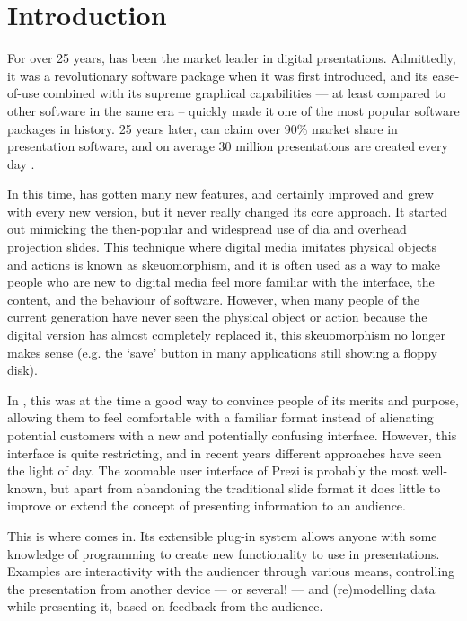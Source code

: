 
 \chapter{Introduction}

  For over 25 years, \ppt* has been the market leader in digital prsentations.
  Admittedly, it was a revolutionary software package when it was first
  introduced, and its ease-of-use combined with its supreme graphical
  capabilities --- at least compared to other software in the same era --
  quickly made it one of the most popular software packages in history. 25
  years later, \ppt* can claim over 90\% market share in presentation software,
  and on average 30 million \ppt presentations are created every day
  \citep{parker-1, drucker-1, bajaj-1}.

  In this time, \ppt* has gotten many new features, and certainly improved and
  grew with every new version, but it never really changed its core approach.
  It started out mimicking the then-popular and widespread use of dia and
  overhead projection slides. This technique where digital media imitates
  physical objects and actions is known as skeuomorphism, and it is often used
  as a way to make people who are new to digital media feel more familiar with
  the interface, the content, and the behaviour of software. However, when
  many people of the current generation have never seen the physical object or
  action because the digital version has almost completely replaced it, this
  skeuomorphism no longer makes sense (e.g. the `save' button in many
  applications still showing a floppy disk).

  In \ppt, this was at the time a good way to convince people of its merits and
  purpose, allowing them to feel comfortable with a familiar format instead of
  alienating potential customers with a new and potentially confusing
  interface.  However, this interface is quite restricting, and in recent years
  different approaches have seen the light of day. The zoomable user interface
  of Prezi is probably the most well-known, but apart from abandoning the
  traditional slide format it does little to improve or extend the concept of
  presenting information to an audience.

  This is where \mxp comes in. Its extensible plug-in system allows anyone with
  some knowledge of programming to create new functionality to use in
  presentations. Examples are interactivity with the audiencer through various
  means, controlling the presentation from another device --- or several! ---
  and (re)modelling data while presenting it, based on feedback from the
  audience.

